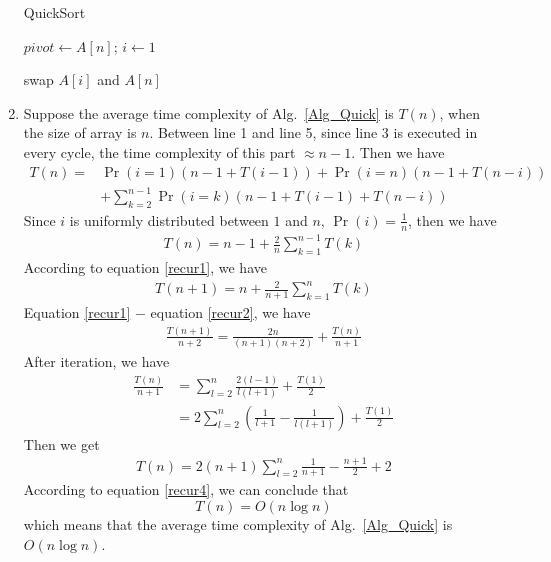 \documentclass[12pt,a4paper,UTF8]{article}
\makeatletter
\newtheorem*{solution}{Solution}
\theoremstyle{definition}
\renewenvironment{solution}[1][Solution] {\par\pushQED{\qed}\normalfont\topsep6\p@\@plus6\p@\relax\trivlist\item[\hskip\labelsep\bfseries#1\@addpunct{.}]\ignorespaces}{\popQED\endtrivlist\@endpefalse} \makeatother
\makeatother
\begin{document}
\begin{enumerate}
\begin{minipage}[t]{0.8\textwidth}
\begin{algorithm}[H]
      \BlankLine
      \caption{QuickSort}\label{Alg_Quick}


      $pivot \leftarrow A[n]$; $i \leftarrow 1$\;

      swap $A[i]$ and $A[n]$\;
    \end{algorithm}
    \end{minipage}

    \begin{solution}
        Suppose the average time complexity of Alg.~\ref{Alg_Quick} is $T(n)$, when the size of array is $n$. Between line 1 and line 5, since line 3 is executed in every cycle, the time complexity of this part $\approx n - 1$. Then we have
        \begin{align*}
        T(n) = &\Pr(i = 1)(n-1 + T(i-1)) + \Pr(i = n)(n-1 + T(n - i))\\ &+ \sum_{k = 2}^{n-1} \Pr(i=k)(n-1+T(i-1)+T(n - i))
        \end{align*}
        Since $i$ is uniformly distributed between $1$ and $n$, $\Pr(i) = \frac{1}{n} $, then we have
        \begin{align}\label{recur1}
        T(n) = n-1 + \frac{2}{n} \sum_{k=1}^{n-1}T(k)
        \end{align}
        According to equation \ref{recur1}, we have
        \begin{align}\label{recur2}
        T(n+1) = n + \frac{2}{n+1} \sum_{k=1}^{n}T(k)
        \end{align}
        Equation \ref{recur1} $-$ equation \ref{recur2}, we have
        \begin{align}\label{recur3}
        \frac{T(n+1)}{n+2} = \frac{2n}{(n+1)(n+2)} + \frac{T(n)}{n+1}
        \end{align}
        After iteration, we have
        \begin{align*}
        \frac{T(n)}{n+1} &= \sum_{l=2}^{n}\frac{2(l-1)}{l(l+1)} + \frac{T(1)}{2}\\
        &= 2\sum_{l=2}^{n}(\frac{1}{l+1} - \frac{1}{l(l+1)}) + \frac{T(1)}{2}
        \end{align*}
        Then we get
        \begin{align}\label{recur4}
        T(n) = 2(n+1)\sum_{l=2}^{n}\frac{1}{n+1} - \frac{n+1}{2} + 2
        \end{align}
        According to equation \ref{recur4}, we can conclude that 
        $$ T(n) = O(n\log n)$$
        which means that the average time complexity of Alg.~\ref{Alg_Quick} is $ O(n\log n) $.
    \end{solution}


\end{enumerate}
\end{document}
